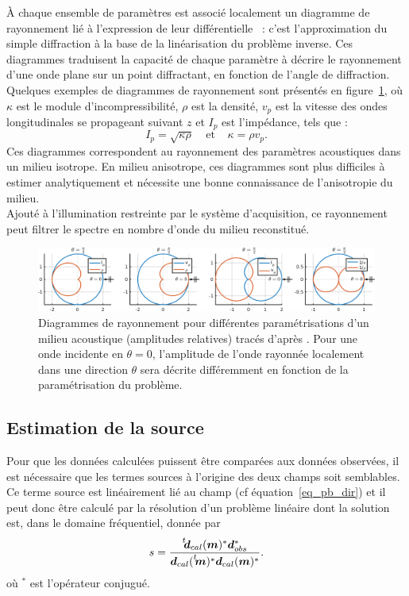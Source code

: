 À chaque ensemble de paramètres est associé localement un diagramme de rayonnement lié à l'expression de leur différentielle~\citep{forgues} : c'est l'approximation du simple diffraction à la base de la linéarisation du problème inverse. Ces diagrammes traduisent la capacité de chaque paramètre à décrire le rayonnement d'une onde plane sur un point diffractant, en fonction de l'angle de diffraction. Quelques exemples de diagrammes de rayonnement sont présentés en figure~\ref{rayonnement}, où $\kappa$ est le module d'incompressibilité, $\rho$ est la densité, $v_{p}$ est la vitesse des ondes longitudinales se propageant suivant $z$ et $I_{p}$ est l'impédance, tels que : 
\begin{equation*}
	I_{p}=\sqrt{\kappa \rho}~~~~~\text{et}~~~~~\kappa=\rho v_{p}\text{.}
\end{equation*}
Ces diagrammes correspondent au rayonnement des paramètres acoustiques dans un milieu isotrope. En milieu anisotrope, ces diagrammes sont plus difficiles à estimer analytiquement et nécessite une bonne connaissance de l'anisotropie du milieu.\\

Ajouté à l'illumination restreinte  par le système d'acquisition, ce rayonnement peut filtrer le spectre en nombre d'onde du milieu reconstitué. 


\begin{figure}[!h]
	\hspace{-1cm}\includegraphics[width=1.1\textwidth]{img/rayonnement.png}
	\caption{Diagrammes de rayonnement pour différentes paramétrisations d'un milieu acoustique (amplitudes relatives) tracés d'après \cite{forgues}. Pour une onde incidente en $\theta=0$, l'amplitude de l'onde rayonnée localement dans une direction $\theta$ sera décrite différemment en fonction de la paramétrisation du problème. \label{rayonnement}}
\end{figure}

\subsection{Estimation de la source}
Pour que les données calculées puissent être comparées aux données observées, il est nécessaire que les termes sources à l'origine des deux champs soit semblables. Ce terme source est linéairement lié au champ (cf équation~\ref{eq_pb_dir}) et il peut donc être calculé par la résolution d'un problème linéaire \citep{pratt_99} dont la solution est, dans le domaine fréquentiel, donnée par 
\begin{equation}
s=\frac{\tr{\bm{d}_{cal}(\bm{m})^{*}}\bm{d}_{obs}^{*}}{\bm{d}_{cal}(\tr{\bm{m})^{*}}\bm{d}_{cal}(\bm{m})^{*}}\text{.}
\end{equation}
où $^{*}$ est l'opérateur conjugué.
 


